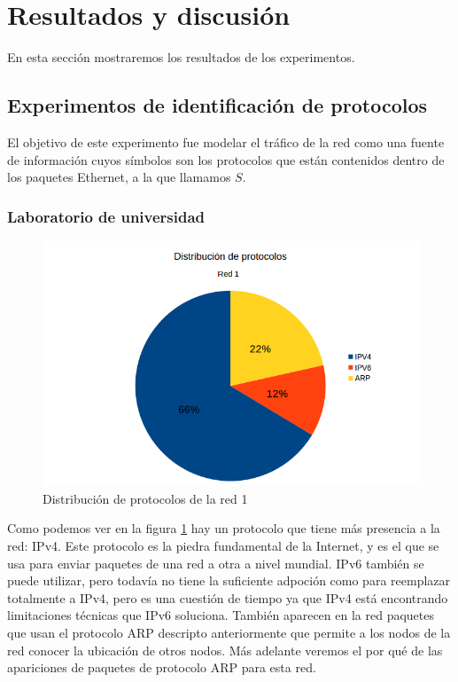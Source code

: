 \section{Resultados y discusión}
En esta sección mostraremos los resultados de los experimentos.

\subsection{Experimentos de identificación de protocolos}

El objetivo de este experimento fue modelar el tráfico de la red como una fuente de información cuyos símbolos son los protocolos que están contenidos dentro de los paquetes Ethernet, a la que llamamos $S$.

\subsubsection{Laboratorio de universidad}

\begin{figure}[H]
	\centering
	\includegraphics[scale=0.65]{imgs/red1_capturar.png}
	\caption{Distribución de protocolos de la red 1}
      \label{red1_capturar}
\end{figure}

Como podemos ver en la figura \ref{red1_capturar} hay un protocolo que tiene más presencia a la red: IPv4. Este protocolo es la piedra fundamental de la Internet, y es el que se usa para enviar paquetes de una red a otra a nivel mundial. IPv6 también se puede utilizar, pero todavía no tiene la suficiente adpoción como para reemplazar totalmente a IPv4, pero es una cuestión de tiempo ya que IPv4 está encontrando limitaciones técnicas que IPv6 soluciona. También aparecen en la red paquetes que usan el protocolo ARP descripto anteriormente que permite a los nodos de la red conocer la ubicación de otros nodos. Más adelante veremos el por qué de las apariciones de paquetes de protocolo ARP para esta red.

